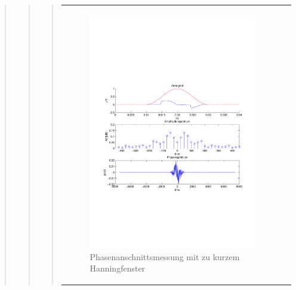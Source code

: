 \begin{quote}
\begin{quote}
\begin{quote}
\begin{center}
\begin{tabular}{ll}
\begin{minipage}{0.6\textwidth}
                    \end{minipage}
                    \begin{minipage}{0.6\textwidth}
    
                         \begin{figure}[H]
                            \label{fig:}
                            \includegraphics[scale=0.4, trim = 1.5cm 7cm 1.5cm 8cm,
                            clip]{./Bilder/Phasenanschnittsmessungmithanningfensterleckeffekt} %
                            \caption{Phasenanschnittsmessung mit zu kurzem Hanningfenster}
                        \end{figure}
                   \vspace{-1.5em}
    
                    \end{minipage}
    

\end{tabular}
\end{center}
\end{quote}
\end{quote}
\end{quote}
